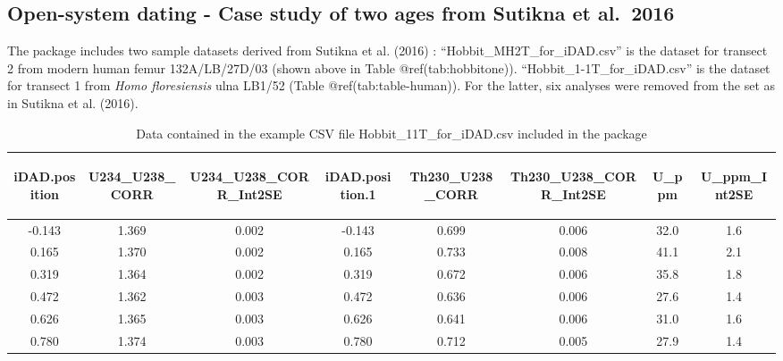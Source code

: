 \documentclass[]{elsarticle} %
\begin{document}
\hypertarget{open-system-dating---case-study-of-two-ages-from-sutikna-et-al.-2016}{%
\subsection{Open-system dating - Case study of two ages from Sutikna et al.~2016}\label{open-system-dating---case-study-of-two-ages-from-sutikna-et-al.-2016}}

The package includes two sample datasets derived from Sutikna et al. (2016) : ``Hobbit\_MH2T\_for\_iDAD.csv'' is the dataset for transect 2 from modern human femur 132A/LB/27D/03 (shown above in Table @ref(tab:hobbitone)). ``Hobbit\_1-1T\_for\_iDAD.csv'' is the dataset for transect 1 from \emph{Homo floresiensis} ulna LB1/52 (Table @ref(tab:table-human)). For the latter, six analyses were removed from the set as in Sutikna et al. (2016).

\begin{table}[ht]
\centering
\begin{tabular}{cccccccc}
  \hline
\begin{sideways} iDAD.position \end{sideways} & \begin{sideways} U234\_U238\_CORR \end{sideways} & \begin{sideways} U234\_U238\_CORR\_Int2SE \end{sideways} & \begin{sideways} iDAD.position.1 \end{sideways} & \begin{sideways} Th230\_U238\_CORR \end{sideways} & \begin{sideways} Th230\_U238\_CORR\_Int2SE \end{sideways} & \begin{sideways} U\_ppm \end{sideways} & \begin{sideways} U\_ppm\_Int2SE \end{sideways} \\ 
  \hline
-0.143 & 1.369 & 0.002 & -0.143 & 0.699 & 0.006 & 32.0 & 1.6 \\ 
  0.165 & 1.370 & 0.002 & 0.165 & 0.733 & 0.008 & 41.1 & 2.1 \\ 
  0.319 & 1.364 & 0.002 & 0.319 & 0.672 & 0.006 & 35.8 & 1.8 \\ 
  0.472 & 1.362 & 0.003 & 0.472 & 0.636 & 0.006 & 27.6 & 1.4 \\ 
  0.626 & 1.365 & 0.003 & 0.626 & 0.641 & 0.006 & 31.0 & 1.6 \\ 
  0.780 & 1.374 & 0.003 & 0.780 & 0.712 & 0.005 & 27.9 & 1.4 \\ 
   \hline
\end{tabular}
\caption{\label{tab:table-human}Data contained in the example CSV file Hobbit\_1\-1T\_for\_iDAD.csv included in the package} 
\end{table}
\end{document}

